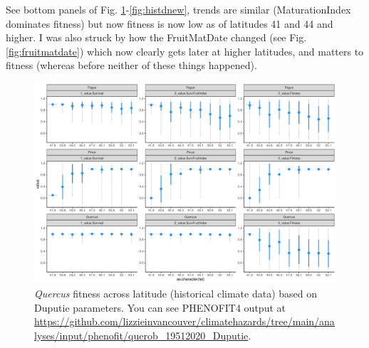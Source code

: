 \documentclass[11pt,letter]{article}
\begin{document}
See bottom panels of Fig. \ref{fig:histdup}-\ref{fig:histdnew}, trends are similar (MaturationIndex dominates fitness) but now fitness is now low as of latitudes 41 and 44 and higher. I was also struck by how the FruitMatDate changed (see Fig. \ref{fig:fruitmatdate}) which now clearly gets later at higher latitudes, and matters to fitness (whereas before neither of these things happened). 

\begin{figure}[h!]
 \begin{center}
\noindent \includegraphics[width=1\textwidth]{..//analyses/graphs/phenofit/historical/fitnessBuildup_DuputieQuercus.pdf}
  \caption{\emph{Quercus} fitness across latitude (historical climate data) based on Duputie parameters. You can see PHENOFIT4 output at \url{https://github.com/lizzieinvancouver/climatehazards/tree/main/analyses/input/phenofit/querob_19512020_Duputie}.}
  \label{fig:histdup}
  \end{center}
\end{figure}
\end{document}
